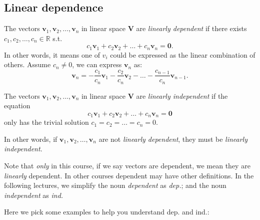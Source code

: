 \subsection{Linear dependence}
\begin{definition}
The vectors $\bm v_1,\bm v_2,\dots,\bm v_n$ in linear space $\bm V$ are \emph{linearly dependent} if there exists $c_1,c_2,\dots,c_n\in\mathbb{R}$ s.t.
\[
c_1\bm v_1+c_2\bm v_2 +\dots+c_n\bm v_n = \bm 0.
\]
In other words, it means one of $v_i$ could be expressed as the linear combination of others. Assume $c_n\ne 0$, we can express $\bm v_n$ as:
\[
\bm v_n = -\frac{c_1}{c_n}\bm v_1-\frac{c_2}{c_n}\bm v_2 -\dots-\frac{c_{n-1}}{c_n}\bm v_{n-1}.
\]
\end{definition}
\begin{definition}
The vectors $\bm v_1,\bm v_2,\dots,\bm v_n$ in linear space $\bm V$ are \emph{linearly independent} if the equation
\[
c_1\bm v_1+c_2\bm v_2 +\dots+c_n\bm v_n = \bm 0
\]
only has the trivial solution $c_1=c_2=\dots=c_n=0$.

In other words, if $\bm v_1,\bm v_2,\dots,\bm v_n$ are not \emph{linearly dependent}, they must be \emph{linearly independent}.
\end{definition}
\begin{remark}
Note that \emph{only} in this course, if we say vectors are dependent, we mean they are \emph{linearly} dependent. In other courses dependent may have other definitions. In the following lectures, we simplify the noun 
\textit{dependent} as \textit{dep.}; and the noun \textit{independent} as \textit{ind.}
\end{remark}
Here we pick some examples to help you understand dep. and ind.:

